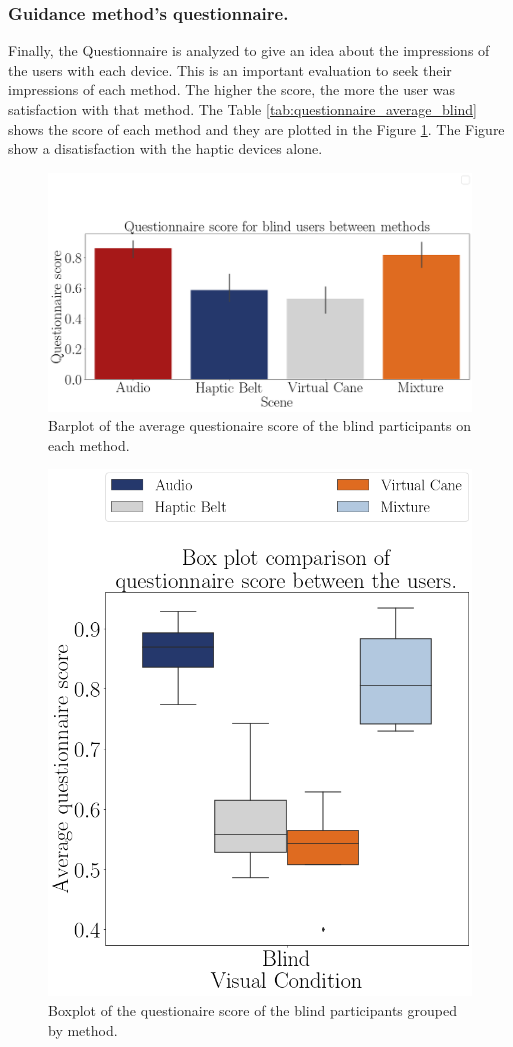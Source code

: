 \subsubsection{Guidance method's questionnaire.}
\label{subsubsec:results_questionnaires}

Finally, the Questionnaire is analyzed to give an idea about the impressions of the users with each device. This is an important evaluation to seek their impressions of each method. The higher the score, the more the user was satisfaction with that method. The Table \ref{tab:questionnaire_average_blind} shows the score of each method and they are plotted in the Figure \ref{fig:barplot_questionnaire_scene_blind}. The Figure show a disatisfaction with the haptic devices alone.



\begin{figure}[!htb]
    \centering
    \includegraphics[width = 0.8\linewidth]{Resultados/Questionario/Figuras/png/barplot_questionnaire_scene_blind.png}
    \caption{Barplot of the average questionaire score of the blind participants on each method.}
    \label{fig:barplot_questionnaire_scene_blind}
\end{figure}

\begin{figure}[!htb]
    \centering
    \includegraphics[width = 0.6\linewidth]{Resultados/Questionario/Figuras/png/boxplot_questionnaire_scene_blind.png}
    \caption{Boxplot of the questionaire score of the blind participants grouped by method.}
    \label{fig:boxplot_quest_blind_scene}
\end{figure}

